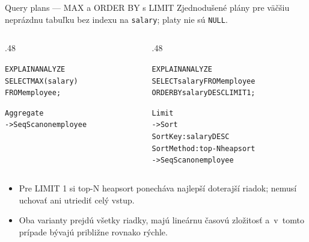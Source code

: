 \documentclass[12pt]{beamer}
\begin{document}
\begin{frame}[fragile]{Query plans --- MAX a ORDER BY s LIMIT}
Zjednodušené plány pre väčšiu neprázdnu tabuľku bez indexu na
\texttt{salary}; platy nie sú \texttt{NULL}.

\begin{columns}[T]
\begin{column}{.48\textwidth}
\scriptsize
\begin{alltt}
EXPLAIN ANALYZE
SELECT MAX(salary)
FROM employee;

Aggregate
  -> Seq Scan on employee
\end{alltt}
\end{column}
\begin{column}{.48\textwidth}
\scriptsize
\begin{alltt}
EXPLAIN ANALYZE
SELECT salary FROM employee
ORDER BY salary DESC LIMIT 1;

Limit
  -> Sort
       Sort Key: salary DESC
       Sort Method: \alert{top-N heapsort}
       -> Seq Scan on employee
\end{alltt}
\end{column}
\end{columns}

\bigskip

\begin{itemize}
\item Pre LIMIT 1 si top-N heapsort ponecháva najlepší doterajší riadok;
  nemusí uchovať ani utriediť celý vstup.
\item Oba varianty prejdú všetky riadky, majú lineárnu časovú zložitosť
  a~v~tomto prípade bývajú približne rovnako rýchle.
\end{itemize}
\end{frame}
\end{document}

